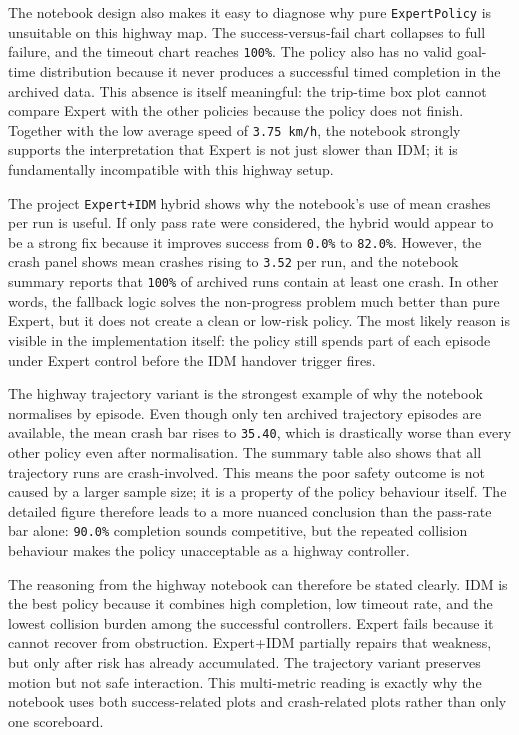 \documentclass[12pt,a4paper]{report}
\begin{document}
The notebook design also makes it easy to diagnose why pure \texttt{ExpertPolicy} is unsuitable on this highway map. The success-versus-fail chart collapses to full failure, and the timeout chart reaches \texttt{100\%}. The policy also has no valid goal-time distribution because it never produces a successful timed completion in the archived data. This absence is itself meaningful: the trip-time box plot cannot compare Expert with the other policies because the policy does not finish. Together with the low average speed of \texttt{3.75 km/h}, the notebook strongly supports the interpretation that Expert is not just slower than IDM; it is fundamentally incompatible with this highway setup.

The project \texttt{Expert+IDM} hybrid shows why the notebook's use of mean crashes per run is useful. If only pass rate were considered, the hybrid would appear to be a strong fix because it improves success from \texttt{0.0\%} to \texttt{82.0\%}. However, the crash panel shows mean crashes rising to \texttt{3.52} per run, and the notebook summary reports that \texttt{100\%} of archived runs contain at least one crash. In other words, the fallback logic solves the non-progress problem much better than pure Expert, but it does not create a clean or low-risk policy. The most likely reason is visible in the implementation itself: the policy still spends part of each episode under Expert control before the IDM handover trigger fires.

The highway trajectory variant is the strongest example of why the notebook normalises by episode. Even though only ten archived trajectory episodes are available, the mean crash bar rises to \texttt{35.40}, which is drastically worse than every other policy even after normalisation. The summary table also shows that all trajectory runs are crash-involved. This means the poor safety outcome is not caused by a larger sample size; it is a property of the policy behaviour itself. The detailed figure therefore leads to a more nuanced conclusion than the pass-rate bar alone: \texttt{90.0\%} completion sounds competitive, but the repeated collision behaviour makes the policy unacceptable as a highway controller.

The reasoning from the highway notebook can therefore be stated clearly. IDM is the best policy because it combines high completion, low timeout rate, and the lowest collision burden among the successful controllers. Expert fails because it cannot recover from obstruction. Expert+IDM partially repairs that weakness, but only after risk has already accumulated. The trajectory variant preserves motion but not safe interaction. This multi-metric reading is exactly why the notebook uses both success-related plots and crash-related plots rather than only one scoreboard.
\end{document}
